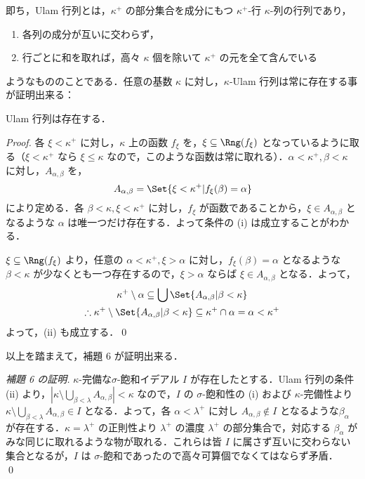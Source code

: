 \documentclass[a4j,uplatex]{jsarticle}
\begin{document}
即ち，Ulam 行列とは，$\kappa^+$ の部分集合を成分にもつ $\kappa^+$-行 $\kappa$-列の行列であり，
\begin{enumerate}[label=(\roman*)]
 \item 各列の成分が互いに交わらず，
 \item 行ごとに和を取れば，高々 $\kappa$ 個を除いて $\kappa^+$ の元を全て含んでいる
\end{enumerate}
ようなもののことである．任意の基数 $\kappa$ に対し，$\kappa$-Ulam 行列は常に存在する事が証明出来る：
\begin{lemma}\label{lem:Ulam-matrix-exists}
 Ulam 行列は存在する．
\end{lemma}
\begin{proof}
 各 $\xi < \kappa^+$ に対し，$\kappa$ 上の函数 $f_\xi$ を，$\xi \subseteq \Rng(f_\xi)$ となっているように取る（$\xi < \kappa^+$ なら $\xi \leq \kappa$ なので，このような函数は常に取れる）．$\alpha < \kappa^+, \beta < \kappa$ に対し，$A_{\alpha, \beta}$ を，
 \[
  A_{\alpha, \beta} = \Set{\xi < \kappa^+ | f_\xi(\beta) = \alpha }
 \]
 により定める．各 $\beta < \kappa, \xi < \kappa^+$ に対し，$f_\xi$ が函数であることから，$\xi \in A_{\alpha, \beta}$ となるような $\alpha$ は唯一つだけ存在する．よって条件の (i) は成立することがわかる．

 $\xi \subseteq \Rng(f_\xi)$ より，任意の $\alpha < \kappa^+, \xi > \alpha$ に対し，$f_\xi(\beta) = \alpha$ となるような $\beta < \kappa$ が少なくとも一つ存在するので，$\xi > \alpha$ ならば $\xi \in A_{\alpha, \beta}$ となる．よって，
 \begin{gather*}
  \kappa^+ \setminus \alpha \subseteq \bigcup\Set{ A_{\alpha, \beta} | \beta < \kappa}\\
  \therefore \kappa^+ \setminus \Set{ A_{\alpha, \beta} | \beta < \kappa}
  \subseteq \kappa^+ \cap \alpha = \alpha < \kappa^+
 \end{gather*}
 よって，(ii) も成立する．\qed
\end{proof}

以上を踏まえて，補題 $6$ が証明出来る．
\begin{proof}[補題 6 の証明]
 $\kappa$-完備な$\sigma$-飽和イデアル $I$ が存在したとする．Ulam 行列の条件 (ii) より，$|\kappa \setminus \bigcup_{\beta < \lambda} A_{\alpha, \beta}| < \kappa$ なので，$I$ の $\sigma$-飽和性の (i) および $\kappa$-完備性より $\kappa \setminus \bigcup_{\beta < \lambda} A_{\alpha, \beta} \in I$ となる．よって，各 $\alpha < \lambda^+$ に対し $A_{\alpha, \beta} \notin I$ となるような$\beta_\alpha$ が存在する．$\kappa = \lambda^+$ の正則性より $\lambda^+$ の濃度 $\lambda^+$ の部分集合で，対応する $\beta_\alpha$ がみな同じに取れるような物が取れる．これらは皆 $I$ に属さず互いに交わらない集合となるが，$I$ は $\sigma$-飽和であったので高々可算個でなくてはならず矛盾． \qed
\end{proof}
\end{document}
